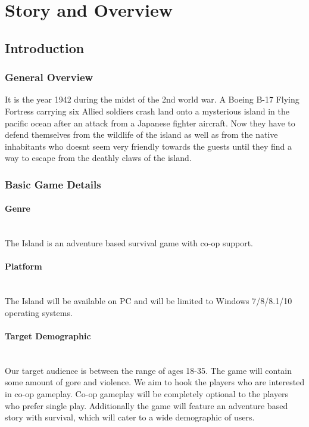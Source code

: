 \section{Story and Overview}
    \subsection{Introduction}
        \subsubsection{General Overview}
            It is the year 1942 during the midst of the 2nd world war. 
            A Boeing B-17 Flying Fortress carrying six Allied soldiers crash 
            land onto a mysterious island in the pacific ocean after an attack 
            from a Japanese fighter aircraft. Now they have to defend themselves 
            from the wildlife of the island as well as from the native inhabitants 
            who doesn\textquotesingle t seem very friendly towards the guests until they find a 
            way to escape from the deathly claws of the island.
        \subsubsection{Basic Game Details}
            \paragraph{Genre}\mbox{}\\
                The Island is an adventure based survival game with co-op support. 
            \paragraph{Platform}\mbox{}\\
                The Island will be available on PC and will be limited to Windows 7/8/8.1/10 operating systems. 
            \paragraph{Target Demographic}\mbox{}\\
                Our target audience is between the range of ages 18-35. The game 
                will contain some amount of gore and violence. We aim to hook the 
                players who are interested in co-op gameplay. Co-op gameplay will 
                be completely optional to the players who prefer single play. 
                Additionally the game will feature an adventure based story with 
                survival, which will cater to a wide demographic of users. 

